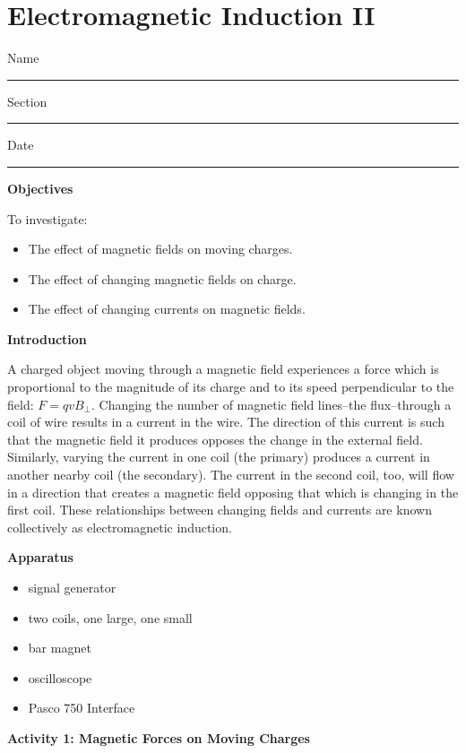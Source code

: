 
\section{Electromagnetic Induction II}

Name \rule{2.0in}{0.1pt}\hfill{}Section \rule{1.0in}{0.1pt}\hfill{}Date
\rule{1.0in}{0.1pt}

\textbf{Objectives}

To investigate:

\begin{itemize}
\item The effect of magnetic fields on moving charges. 
\item The effect of changing magnetic fields on charge.
\item The effect of changing currents on magnetic fields.
\end{itemize}
\textbf{Introduction} 

A charged object moving through a magnetic field experiences a force
which is proportional to the magnitude of its charge and to its speed
perpendicular to the field: $F = qvB_\perp$. Changing the number of
magnetic field lines--the flux--through a coil of wire results in
a current in the wire. The direction of this current is such that
the magnetic field it produces opposes the change in the external
field. Similarly, varying the current in one coil (the primary) produces
a current in another nearby coil (the secondary). The current in the
second coil, too, will flow in a direction that creates a magnetic
field opposing that which is changing in the first coil. These relationships
between changing fields and currents are known collectively as electromagnetic
induction.

\textbf{Apparatus} 

\begin{itemize}
\item signal generator 
\item two coils, one large, one small 
\item bar magnet
\item oscilloscope
\item Pasco 750 Interface
\end{itemize}
\textbf{Activity 1: Magnetic Forces on Moving Charges }

